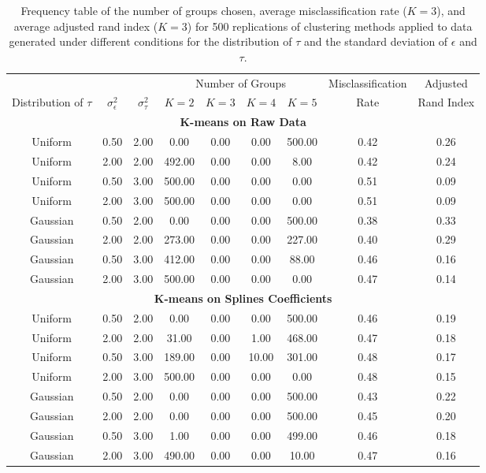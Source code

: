 \documentclass[12pt]{article}
\begin{document}
\begin{table}[ht]
\begin{center}
\begin{tabular}{ccc|cccccc}
  \hline &&&\multicolumn{4}{c}{Number of Groups}&Misclassification&Adjusted\\ Distribution of $\tau$&$\sigma_{\epsilon}^2$&$\sigma_{\tau}^2$&$K=2$&$K=3$&$K=4$&$K=5$&Rate&Rand Index\\ \hline\multicolumn{9}{c}{\textbf{K-means on Raw Data}}\\ Uniform & 0.50 & 2.00 & 0.00 & 0.00 & 0.00 & 500.00 & 0.42 & 0.26 \\ 
  Uniform & 2.00 & 2.00 & 492.00 & 0.00 & 0.00 & 8.00 & 0.42 & 0.24 \\ 
  Uniform & 0.50 & 3.00 & 500.00 & 0.00 & 0.00 & 0.00 & 0.51 & 0.09 \\ 
  Uniform & 2.00 & 3.00 & 500.00 & 0.00 & 0.00 & 0.00 & 0.51 & 0.09 \\ 
  Gaussian & 0.50 & 2.00 & 0.00 & 0.00 & 0.00 & 500.00 & 0.38 & 0.33 \\ 
  Gaussian & 2.00 & 2.00 & 273.00 & 0.00 & 0.00 & 227.00 & 0.40 & 0.29 \\ 
  Gaussian & 0.50 & 3.00 & 412.00 & 0.00 & 0.00 & 88.00 & 0.46 & 0.16 \\ 
  Gaussian & 2.00 & 3.00 & 500.00 & 0.00 & 0.00 & 0.00 & 0.47 & 0.14 \\ 
   \multicolumn{9}{c}{\textbf{K-means on Splines Coefficients}}\\Uniform & 0.50 & 2.00 & 0.00 & 0.00 & 0.00 & 500.00 & 0.46 & 0.19 \\ 
  Uniform & 2.00 & 2.00 & 31.00 & 0.00 & 1.00 & 468.00 & 0.47 & 0.18 \\ 
  Uniform & 0.50 & 3.00 & 189.00 & 0.00 & 10.00 & 301.00 & 0.48 & 0.17 \\ 
  Uniform & 2.00 & 3.00 & 500.00 & 0.00 & 0.00 & 0.00 & 0.48 & 0.15 \\ 
  Gaussian & 0.50 & 2.00 & 0.00 & 0.00 & 0.00 & 500.00 & 0.43 & 0.22 \\ 
  Gaussian & 2.00 & 2.00 & 0.00 & 0.00 & 0.00 & 500.00 & 0.45 & 0.20 \\ 
  Gaussian & 0.50 & 3.00 & 1.00 & 0.00 & 0.00 & 499.00 & 0.46 & 0.18 \\ 
  Gaussian & 2.00 & 3.00 & 490.00 & 0.00 & 0.00 & 10.00 & 0.47 & 0.16 \\ 
   \hline\end{tabular}
\caption{Frequency table of the number of groups chosen, average misclassification rate ($K=3$), and average adjusted rand index ($K=3$) for 500 replications of clustering methods applied to data generated under different conditions for the distribution of $\tau$ and the standard deviation of $\epsilon$ and $\tau$.}
\label{fig:se}
\end{center}
\end{table}
\end{document}
